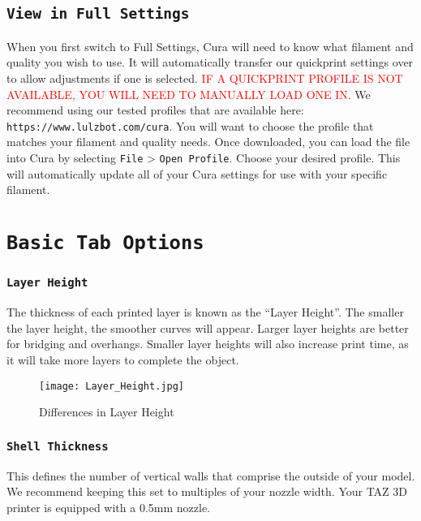 \subsection{\texttt{View in Full Settings}}
When you first switch to Full Settings, Cura will need to know what filament and quality you wish to use. It will automatically transfer our quickprint settings over to allow adjustments if one is selected. \textcolor{red}{IF A QUICKPRINT PROFILE IS NOT AVAILABLE, YOU WILL NEED TO MANUALLY LOAD ONE IN.} We recommend using our tested profiles that are available here: \texttt{https://www.lulzbot.com/cura}. You will want to choose the profile that matches your filament and quality needs. Once downloaded, you can load the file into Cura by selecting \texttt{File} > \texttt{Open Profile}. Choose your desired profile. This will automatically update all of your Cura settings for use with your specific filament.

\section{\texttt{Basic Tab Options}}

\subsubsection{\texttt{Layer Height}}
The thickness of each printed layer is known as the ``Layer Height''. The smaller the layer height, the smoother curves will appear. Larger layer heights are better for bridging and overhangs. Smaller layer heights will also increase print time, as it will take more layers to complete the object.
\begin{figure}[H]
\centering
\texttt{[image: Layer\_Height.jpg]}
\caption{Differences in Layer Height}
\label{fig:Differences in Layer Height}
\end{figure}


\subsubsection{\texttt{Shell Thickness}}
This defines the number of vertical walls that comprise the outside of your model. We recommend keeping this set to multiples of your nozzle width. Your TAZ 3D printer is equipped with a 0.5mm nozzle. %

